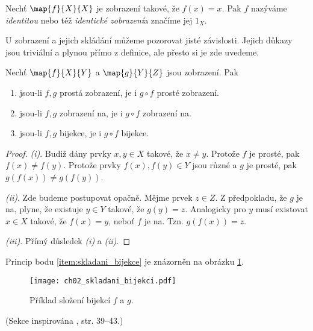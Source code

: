 \begin{definition}[Identita]\label{def:identita}
    Nechť $\map{f}{X}{X}$ je zobrazení takové, že $f(x)=x$. Pak $f$ nazýváme \emph{identitou} nebo též \emph{identické zobrazení}a značíme jej $1_X$.
\end{definition}
U zobrazení a jejich skládání můžeme pozorovat jisté závislosti. Jejich důkazy jsou triviální a plynou přímo z definice, ale přesto si je zde uvedeme.
\begin{proposition}\label{prop:vlastnosti_skladani_zobrazeni}
    Nechť $\map{f}{X}{Y}$ a $\map{g}{Y}{Z}$ jsou zobrazení. Pak
    \begin{enumerate}[label=(\roman*)]
        \item\label{item:skladani_injekce} jsou-li $f,g$ prostá zobrazení, je i $g\circ f$ prosté zobrazení.
        \item\label{item:skladani_surjekce} jsou-li $f,g$ zobrazení na, je i $g\circ f$ zobrazení na.
        \item\label{item:skladani_bijekce} jsou-li $f,g$ bijekce, je i $g\circ f$ bijekce.
    \end{enumerate}
\end{proposition}
\begin{proof}
    \textit{(i)}. Budiž dány prvky $x,y\in X$ takové, že $x\neq y$. Protože $f$ je prosté, pak $f(x)\neq f(y)$. Protože prvky $f(x),f(y)\in Y$ jsou různé a $g$ je prosté, pak $g(f(x))\neq g(f(y))$.\par
    \textit{(ii)}. Zde budeme postupovat opačně. Mějme prvek $z\in Z$. Z předpokladu, že $g$ je na, plyne, že existuje $y\in Y$ takové, že $g(y)=z$. Analogicky pro $y$ musí existovat $x\in X$ takové, že $f(x)=y$, neboť $f$ je na. Tzn. $g(f(x))=z$.\par
    \textit{(iii)}. Přímý důsledek \textit{(i)} a \textit{(ii)}.
\end{proof}
Princip bodu \ref{item:skladani_bijekce} je znázorněn na obrázku \ref{fig:skladani_bijekci}.
\begin{figure}[H]
    \centering
    \texttt{[image: ch02\_skladani\_bijekci.pdf]}
    \caption{Příklad složení bijekcí $f$ a $g$.}
    \label{fig:skladani_bijekci}
\end{figure}
(Sekce inspirována \cite{MatousekNesetril2009}, str. 39--43.)